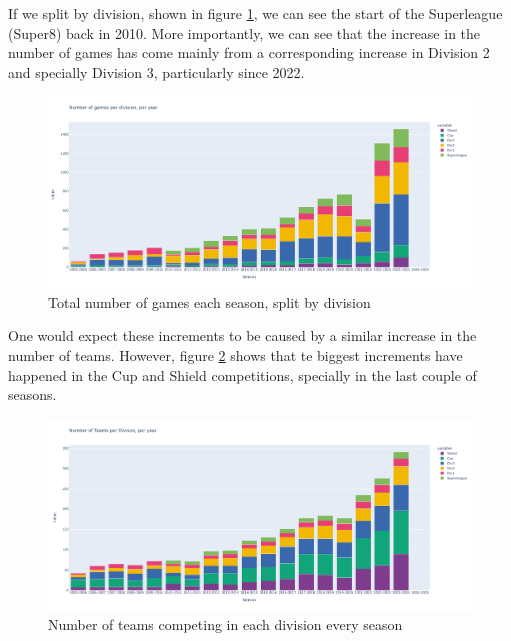 If we split by division, shown in figure \ref{fig:games-per-year-by-division}, we can see the start of the Superleague (Super8) back in 2010. More importantly, we can see that the increase in the number of games has come mainly from a corresponding increase in Division 2 and specially Division 3, particularly since 2022.

\begin{figure}
	\centering
	\includegraphics[width=0.7\linewidth]{games-per-year-by-division.png}
	\caption{Total number of games each season, split by division}
	\label{fig:games-per-year-by-division}
\end{figure}

One would expect these increments to be caused by a similar increase in the number of teams. However, figure \ref{fig:teams-per-year} shows that te biggest increments have happened in the Cup and Shield competitions, specially in the last couple of seasons.

\begin{figure}
	\centering
	\includegraphics[width=0.7\linewidth]{teams-per-year.png}
	\caption{Number of teams competing in each division every season}
	\label{fig:teams-per-year}
\end{figure}
